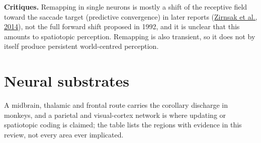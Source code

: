 \documentclass[11pt,a4paper]{article}
\begin{document}
\textbf{Critiques.} Remapping in single neurons is mostly a shift of the receptive field toward the saccade target (predictive convergence) in later reports (\href{https://doi.org/10.1038/nature13149}{Zirnsak et al., 2014}), not the full forward shift proposed in 1992, and it is unclear that this amounts to spatiotopic perception. Remapping is also transient, so it does not by itself produce persistent world-centred perception.

\section{Neural substrates}

A midbrain, thalamic and frontal route carries the corollary discharge in monkeys, and a parietal and visual-cortex network is where updating or spatiotopic coding is claimed; the table lists the regions with evidence in this review, not every area ever implicated.
\end{document}
